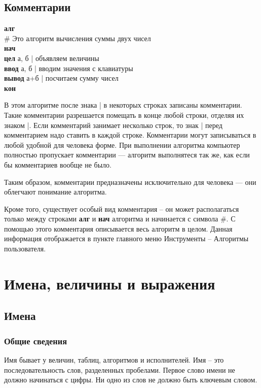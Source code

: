 \subsection{Комментарии}

{\sffamily
\textbf{алг}\\
\otstup \# Это алгоритм вычисления суммы двух чисел\\
\textbf{нач}\\
\otstup \textbf{цел} а, б | объявляем величины\\
\otstup \textbf{ввод} а, б | вводим значения с клавиатуры\\
\otstup \textbf{вывод} а+б | посчитаем сумму чисел\\
\textbf{кон}}

В этом алгоритме после знака \textsf{|} в некоторых строках записаны комментарии. Такие комментарии разрешается помещать в конце любой строки, отделяя их знаком \textsf{|}. Если комментарий занимает несколько строк, то знак \textsf{|} перед комментарием надо ставить в каждой строке. Комментарии могут записываться в любой удобной для человека форме. При выполнении алгоритма компьютер полностью пропускает комментарии --- алгоритм выполнятеся так же, как если бы комментариев вообще не было.

Таким образом, комментарии предназначены исключительно для человека --- они облегчают понимание алгоритма.

Кроме того, существует особый вид комментария -- он может располагаться только между строками \textsf{\textbf{алг}} и \textsf{\textbf{нач}} алгоритма и начинается с символа \textsf{\#}. С помощью этого комментария описывается весь алгоритм в целом. Данная информация отображается в пункте главного меню \textsf{Инструменты -- Алгоритмы пользователя}.

\section{Имена, величины и выражения}

\subsection{Имена}
\label{names}

\subsubsection{Общие сведения}

	Имя бывает у величин, таблиц, алгоритмов и исполнителей.  Имя – это последовательность слов, разделенных пробелами. Первое слово имени не должно начинаться с цифры. Ни одно из слов не должно быть ключевым словом.
	

